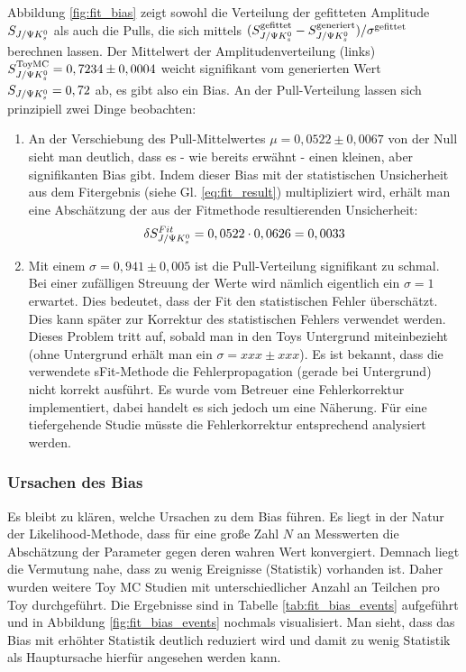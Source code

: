 Abbildung \ref{fig:fit_bias} zeigt sowohl die Verteilung der gefitteten Amplitude $S_{J/\Psi K_s^0}$ als auch die Pulls, die sich mittels $(S_{J/\Psi K_s^0}^{\text{gefittet}} - S_{J/\Psi K_s^0}^{\text{generiert}})/\sigma^{\text{gefittet}}$ berechnen lassen. Der Mittelwert der Amplitudenverteilung (links) $S_{J/\Psi K_s^0}^{\text{ToyMC}} = 0,7234 \pm 0,0004$ weicht signifikant vom generierten Wert $S_{J/\Psi K_s^0} = 0,72$ ab, es gibt also ein Bias. An der Pull-Verteilung lassen sich prinzipiell zwei Dinge beobachten:
\begin{enumerate}
    \item An der Verschiebung des Pull-Mittelwertes $\mu = 0,0522 \pm 0,0067$ von der Null sieht man deutlich, dass es - wie bereits erwähnt - einen kleinen, aber signifikanten Bias gibt. Indem dieser Bias mit der statistischen Unsicherheit aus dem Fitergebnis (siehe Gl. \ref{eq:fit_result}) multipliziert wird, erhält man eine Abschätzung der aus der Fitmethode resultierenden Unsicherheit:
        \begin{align}
        \delta S_{J/\Psi K_s^0}^{Fit} = 0,0522 \cdot 0,0626 = 0,0033
        \end{align}

    \item Mit einem $\sigma = 0,941 \pm 0,005$ ist die Pull-Verteilung signifikant zu schmal. Bei einer zufälligen Streuung der Werte wird nämlich eigentlich ein $\sigma=1$ erwartet. Dies bedeutet, dass der Fit den statistischen Fehler überschätzt. Dies kann später zur Korrektur des statistischen Fehlers verwendet werden. Dieses Problem tritt auf, sobald man in den Toys Untergrund miteinbezieht (ohne Untergrund erhält man ein $\sigma=xxx\pm xxx$). Es ist bekannt, dass die verwendete sFit-Methode die Fehlerpropagation (gerade bei Untergrund) nicht korrekt ausführt. Es wurde vom Betreuer eine Fehlerkorrektur implementiert, dabei handelt es sich jedoch um eine Näherung. Für eine tiefergehende Studie müsste die Fehlerkorrektur entsprechend analysiert werden.
\end{enumerate}

\subsubsection{Ursachen des Bias}
Es bleibt zu klären, welche Ursachen zu dem Bias führen. Es liegt in der Natur der Likelihood-Methode, dass für eine große Zahl $N$ an Messwerten die Abschätzung der Parameter gegen deren wahren Wert konvergiert. Demnach liegt die Vermutung nahe, dass zu wenig Ereignisse (\glqq Statistik\grqq) vorhanden ist. Daher wurden weitere Toy MC Studien mit unterschiedlicher Anzahl an Teilchen pro Toy durchgeführt. Die Ergebnisse sind in Tabelle \ref{tab:fit_bias_events} aufgeführt und in Abbildung \ref{fig:fit_bias_events} nochmals visualisiert. Man sieht, dass das Bias mit erhöhter Statistik deutlich reduziert wird und damit zu wenig Statistik als Hauptursache hierfür angesehen werden kann.

